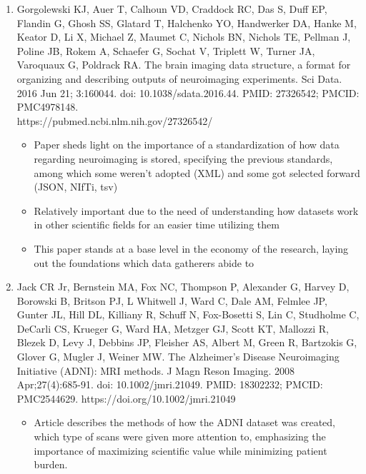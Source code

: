\documentclass[a4paper]{article}
\begin{document}
\begin{enumerate}
      \item Gorgolewski KJ, Auer T, Calhoun VD, Craddock RC, Das S, Duff EP, Flandin G, Ghosh SS, Glatard T,
            Halchenko YO, Handwerker DA, Hanke M, Keator D, Li X, Michael Z, Maumet C, Nichols BN, Nichols TE, Pellman J,
            Poline JB, Rokem A, Schaefer G, Sochat V, Triplett W, Turner JA, Varoquaux G, Poldrack RA. The brain imaging
            data structure, a format for organizing and describing outputs of neuroimaging experiments. Sci Data. 2016 Jun 21;
            3:160044. doi: 10.1038/sdata.2016.44. PMID: 27326542; PMCID: PMC4978148. \\
            https://pubmed.ncbi.nlm.nih.gov/27326542/
            \begin{itemize}
                  \item Paper sheds light on the importance of a standardization of how data regarding neuroimaging is stored,
                        specifying the previous standards, among which some weren't adopted (XML) and some got selected forward (JSON, NIfTi, tsv)
                  \item Relatively important due to the need of understanding how datasets work in other scientific fields for an easier
                        time utilizing them
                  \item This paper stands at a base level in the economy of the research, laying out the foundations which data gatherers
                        abide to
            \end{itemize}
      \item Jack CR Jr, Bernstein MA, Fox NC, Thompson P, Alexander G, Harvey D, Borowski B, Britson PJ, L Whitwell J, Ward C,
            Dale AM, Felmlee JP, Gunter JL, Hill DL, Killiany R, Schuff N, Fox-Bosetti S, Lin C, Studholme C, DeCarli CS, Krueger G,
            Ward HA, Metzger GJ, Scott KT, Mallozzi R, Blezek D, Levy J, Debbins JP, Fleisher AS, Albert M, Green R, Bartzokis G,
            Glover G, Mugler J, Weiner MW. The Alzheimer's Disease Neuroimaging Initiative (ADNI): MRI methods. J Magn Reson Imaging.
            2008 Apr;27(4):685-91. doi: 10.1002/jmri.21049. PMID: 18302232; PMCID: PMC2544629. https://doi.org/10.1002/jmri.21049
            \begin{itemize}
                  \item Article describes the methods of how the ADNI dataset was created, which type of scans were given more attention to,
                        emphasizing the importance of maximizing scientific value while minimizing patient burden.

\end{itemize}
\end{enumerate}
\end{document}
